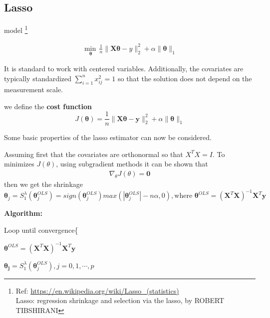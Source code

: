 \newpage
\subsection{Lasso}
\noindent model 
\footnote{
Ref: \href{https://en.wikipedia.org/wiki/Lasso_(statistics)}{https://en.wikipedia.org/wiki/Lasso\_(statistics)}\\
Lasso: regression shrinkage and selection via the lasso, by ROBERT TIBSHIRANI
}

\begin{align}
	\underset{\mathbf{\theta}}{\min\,}  \frac{1}{n} \|\mathbf{X}\mathbf{\theta} - y\|_2 ^2 + \alpha\|\mathbf{\theta}\|_1
\end{align}

\noindent It is standard to work with centered variables. Additionally, the covariates are typically standardized $\sum _{i=1}^{n}x_{ij}^{2} = 1$ so that the solution does not depend on the measurement scale.

\noindent we define the \textbf{cost function}
\begin{equation*}
	J(\mathbf{\theta}) = \frac{1}{n}\| \mathbf{X}\mathbf{\theta} - \mathbf{y} \|_2^2 + \alpha\|\mathbf{\theta}\|_1
\end{equation*}

\noindent Some basic properties of the lasso estimator can now be considered.

\noindent Assuming first that the covariates are orthonormal so that $X^{T}X=I$. To minimizes $J(\theta)$, using subgradient methods it can be shown that
\begin{align*}
	\nabla_{\theta} J(\theta) =  \mathbf{0}
\end{align*}
then we get the shrinkage
\begin{equation*}
	\mathbf{\theta}_j = S_1^{\lambda}(\mathbf{\theta}_j^{OLS}) 
	= sign(\mathbf{\theta}_j^{OLS}) max \left(|\mathbf{\theta}_j^{OLS}| - n \alpha, 0 \right),
	\text{where } \mathbf{\theta}^{OLS} = (\mathbf{X}^T\mathbf{X})^{-1}\mathbf{X}^T\mathbf{y}
\end{equation*}


\noindent \textbf{Algorithm:}

Loop until convergence\{

	\qquad $\mathbf{\theta}^{OLS} = (\mathbf{X}^T\mathbf{X})^{-1}\mathbf{X}^T\mathbf{y}$

	\qquad $\mathbf{\theta_j} = S_1^{\lambda}(\mathbf{\theta}_j^{OLS}), j = 0,1,\cdots,p$

